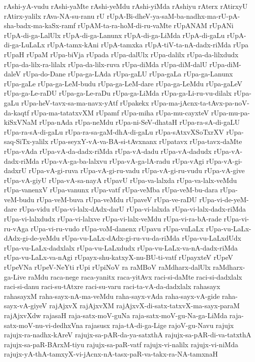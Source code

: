 {rAshi-yA-vudu
rAshi-yaMte
rAshi-yeMdu
rAshi-yiMda
rAshiyu
rAterx
rAtirxyU
rAtirx-yalilx
rAva-NA-su-ranu
rU
rUpA-Bi-dheV-ya-saM-ba-nadhx-ma-rU-pA-sha-badx-ma-kaSx-ramf
rUpAM-ta-ra-hoM-di-ru-vaMte
rUpANAM
rUpANi
rUpA-di-ga-LalUlx
rUpA-di-ga-Lanunx
rUpA-di-ga-LiMda
rUpA-di-gaLu
rUpA-di-ga-LuLaLx
rUpA-tamx-kAni
rUpA-tamxka
rUpA-tiV-ta-nA-dadx-riMda
rUpa
rUpaH
rUpaM
rUpa-biVja
rUpada
rUpa-dalUlx
rUpa-dalilx
rUpa-da-lilxdudx
rUpa-da-lilx-ra-lilalx
rUpa-da-lilx-ruva
rUpa-diMda
rUpa-diM-dalU
rUpa-diM-daleV
rUpa-do-Dane
rUpa-ga-LAda
rUpa-gaLU
rUpa-gaLa
rUpa-ga-Lanunx
rUpa-gaLe
rUpa-ga-LeM-budu
rUpa-ga-LeM-dare
rUpa-ga-LeMdu
rUpa-gaLeV
rUpa-ga-Le-raDU
rUpa-ga-Le-raDu
rUpa-ga-LiMda
rUpa-ga-Li-ru-vu-dilalx
rUpa-gaLu
rUpa-heV-tavx-sa-ma-navx-yAtf
rUpakekx
rUpa-ma-jAcnx-ta-tAvx-pa-noV-da-kaqtf
rUpa-ma-tatatxvXM
rUpamf
rUpa-miha
rUpa-mu-cayxteV
rUpa-mu-pa-kiSxVNaM
rUpa-nAda
rUpa-neMdu
rUpa-ni-SeV-dhataH
rUpa-ra-sA-di-gaLU
rUpa-ra-sA-di-gaLu
rUpa-ra-sa-gaM-dhA-di-gaLu
rUpa-sAtxvXSoTxrXV
rUpa-saq-SiTx-yalilx
rUpa-seyxY-vA-va-BA-si-tAvxnanx
rUpatavx
rUpa-tavx-daMte
rUpa-vAda
rUpa-vA-da-dadx-riMda
rUpa-vA-dadu
rUpa-vA-dadudx
rUpa-vA-dadx-riMda
rUpa-vA-ga-ba-lalxvu
rUpa-vA-ga-lA-radu
rUpa-vAgi
rUpa-vA-gi-dadxrU
rUpa-vA-gi-ruva
rUpa-vA-gi-ru-vadu
rUpa-vA-gi-ru-vudu
rUpa-vA-give
rUpa-vA-giyU
rUpa-vA-sa-nayA
rUpavU
rUpa-va-lalxda
rUpa-va-lalx-veMdu
rUpa-vanenxV
rUpa-vanunx
rUpa-vatf
rUpa-veMba
rUpa-veM-bu-dara
rUpa-veM-budu
rUpa-veM-buva
rUpa-veMdu
rUpaveV
rUpa-ve-raDU
rUpa-vi-de-yeM-dare
rUpa-vidu
rUpa-vi-lalx-dAdx-darU
rUpa-vi-lalxda
rUpa-vi-lalx-dadx-riMda
rUpa-vi-lalxdudx
rUpa-vi-lalxve
rUpa-vi-lalx-veMdu
rUpa-vi-ra-bA-rade
rUpa-vi-ru-vAga
rUpa-vi-ru-vudo
rUpa-voM-danenx
rUpavu
rUpa-vuLaLx
rUpa-vu-LaLx-dAdx-gi-de-yeMdu
rUpa-vu-LaLx-dAdx-gi-ru-vu-da-riMda
rUpa-vu-LaLxdUdx
rUpa-vu-LaLx-dadxlalx
rUpa-vu-LaLxdudx
rUpa-vu-LaLx-va-nA-dadx-riMda
rUpa-vu-LaLx-va-nAgi
rUpayx-shu-katxyX-nu-BU-ti-vatf
rUpayxteV
rUpeV
rUpeVNa
rUpeV-NeYti
rUpi
rUpiNoV
ra
raMBoV
raMdharx-dalUlx
raMdharx-ga-Live
raMdu
raca-nege
raca-yanitx
raca-yitAvx
raci-si-daMte
raci-si-dadxlalx
raci-si-danu
raci-su-tAtxre
raci-su-varu
raci-ta-vA-da-dadxlalx
rahasayx
rahasayxM
raha-sayx-nA-ma-veMdu
raha-sayx-vAda
raha-sayx-vA-gide
raha-sayx-vA-giyeV
rajAjxvX
rajAjxvXM
rajAjxvX-di-satx-tatxvX-ma-sayx-paraM
rajAjxvXdw
rajasaH
raja-satx-moV-guNa
raja-satx-moV-gu-Na-ga-LiMda
raja-satx-moV-nu-vi-dedhxVna
rajasusx
raja-tA-di-ga-Lige
rajoV-gu-Navu
rajujx
rajujx-ra-nadhx-kAreV
rajujx-sa-pAR-da-ya-satxthA
rajujx-sa-pAR-di-va-tatxthA
rajujx-sa-paR-BArxM-tiyu
rajujx-sa-paR-vatf
rajujx-vi-nalilx
rajujx-vi-niMda
rajujx-yA-thA-tamxyX-vi-jAcnx-nA-tasx-paR-va-takx-ra-NA-tamxnaH
}
